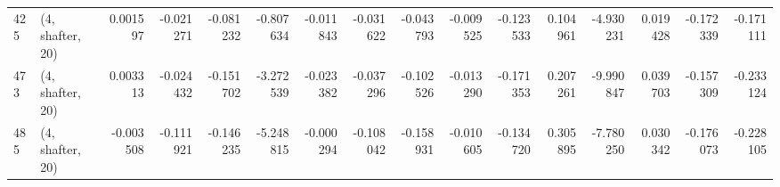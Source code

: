 \begin{tabular}{llrrrrrrrrrrrrrr}
425 &  (4, shafter, 20) &   0.001597 & -0.021271 & -0.081232 &   -0.807634 & -0.011843 &  -0.031622 & -0.043793 & -0.009525 & -0.123533 &  0.104961 &    -4.930231 &  0.019428 & -0.172339 & -0.171111 \\
473 &  (4, shafter, 20) &   0.003313 & -0.024432 & -0.151702 &   -3.272539 & -0.023382 &  -0.037296 & -0.102526 & -0.013290 & -0.171353 &  0.207261 &    -9.990847 &  0.039703 & -0.157309 & -0.233124 \\
485 &  (4, shafter, 20) &  -0.003508 & -0.111921 & -0.146235 &   -5.248815 & -0.000294 &  -0.108042 & -0.158931 & -0.010605 & -0.134720 &  0.305895 &    -7.780250 &  0.030342 & -0.176073 & -0.228105 \\
\bottomrule
\end{tabular}
